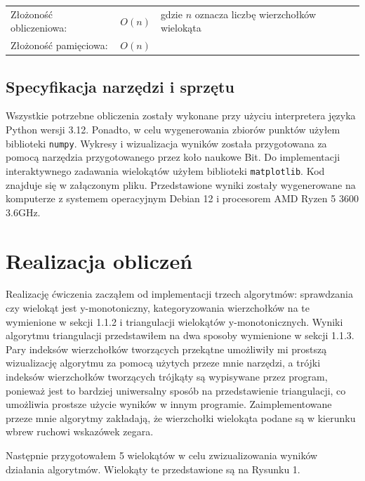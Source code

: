 \documentclass[11pt,a4paper]{article}
\begin{document}
\begin{tabular}{l|l|l}
    Złożoność obliczeniowa: & $O(n)$ & \footnotesize gdzie $n$ oznacza liczbę wierzchołków wielokąta\\
    Złożoność pamięciowa: & $O(n)$ & ~
\end{tabular}
\subsection{Specyfikacja narzędzi i sprzętu}
Wszystkie potrzebne obliczenia zostały wykonane przy użyciu interpretera języka Python wersji 3.12.
Ponadto, w celu wygenerowania zbiorów punktów użyłem biblioteki \verb|numpy|. 
Wykresy i wizualizacja wyników została przygotowana za pomocą narzędzia
przygotowanego przez koło naukowe Bit. Do implementacji interaktywnego
zadawania wielokątów użyłem biblioteki \verb|matplotlib|. Kod znajduje się w załączonym pliku.
Przedstawione wyniki zostały wygenerowane na komputerze z systemem operacyjnym Debian 12 i 
procesorem AMD Ryzen 5 3600 3.6GHz.

\section{Realizacja obliczeń}
Realizację ćwiczenia zacząłem od implementacji trzech algorytmów: 
sprawdzania czy wielokąt jest y-monotoniczny, kategoryzowania
wierzchołków na te wymienione w sekcji 1.1.2 i triangulacji
wielokątów y-monotonicznych. Wyniki algorytmu triangulacji
przedstawiłem na dwa sposoby wymienione w sekcji 1.1.3.
Pary indeksów wierzchołków tworzących przekątne umożliwiły mi
prostszą wizualizację algorytmu za pomocą użytych przeze mnie narzędzi,
a trójki indeksów wierzchołków tworzących trójkąty są wypisywane przez 
program, ponieważ jest to bardziej uniwersalny sposób na przedstawienie
triangulacji, co umożliwia prostsze użycie wyników w innym programie.
Zaimplementowane przeze mnie algorytmy zakładają, że wierzchołki wielokąta
podane są w kierunku wbrew ruchowi wskazówek zegara. 

Następnie przygotowałem 5 wielokątów w celu zwizualizowania wyników
działania algorytmów. Wielokąty te przedstawione są na Rysunku 1.
\end{document}
